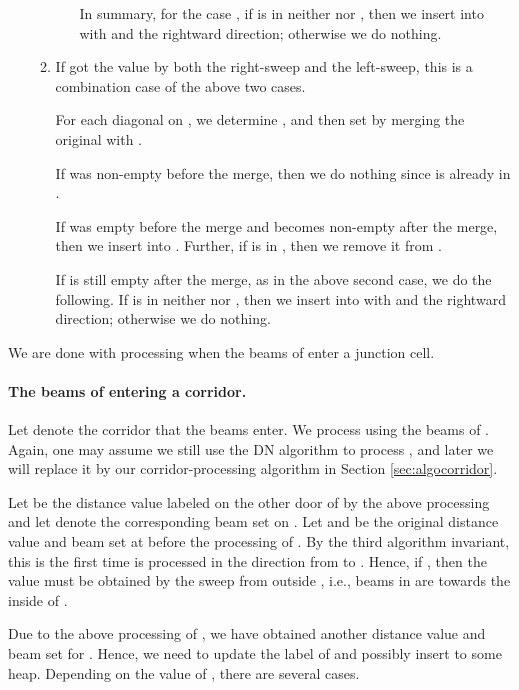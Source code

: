 \documentclass[english,runningheads,11pt]{llncs-revised}
\begin{document}
\begin{enumerate}
\begin{enumerate}
\begin{itemize}
In summary, for the case ,  if  is in
neither  nor , then we insert  into  with
 and the rightward direction; otherwise we do
nothing.

\end{itemize}

\item
If  got the value  by both the right-sweep and the
left-sweep, this is a combination case of the above two cases.

For each diagonal  on , we determine , and
then set  by merging the original  with .

If  was non-empty before the merge, then we do nothing since
 is already in .

If  was empty before the merge and becomes non-empty
after the merge, then we insert  into . Further, if  is
in , then we remove it from .

If  is still empty after the merge, as in the above second
case, we do the following. If  is in neither
 nor , then we insert  into  with
 and the rightward direction; otherwise we do
nothing.
\end{enumerate}
\end{enumerate}

We are done with processing  when the beams  of  enter
a junction cell.

\paragraph{The beams of  entering a corridor.}
Let  denote the corridor that the beams enter.
We process  using the beams of .
Again, one may assume we still use the DN algorithm to process ,
and later we will replace it by our corridor-processing
algorithm in Section \ref{sec:algocorridor}.

Let  be the distance value labeled on the other door  of 
by the above processing and let  denote the corresponding beam set
on . Let  and  be the original distance
value and beam set at  before the processing of .
By the third algorithm invariant, this is the first time  is processed in the direction from  to . Hence, if , then the value  must be obtained by the sweep
from outside , i.e., beams in  are towards the inside of .

Due to the above processing of , we have obtained another distance value  and beam set  for . Hence, we need to update the label of  and possibly insert  to some heap.
Depending on the value of , there are several cases.
\end{document}
